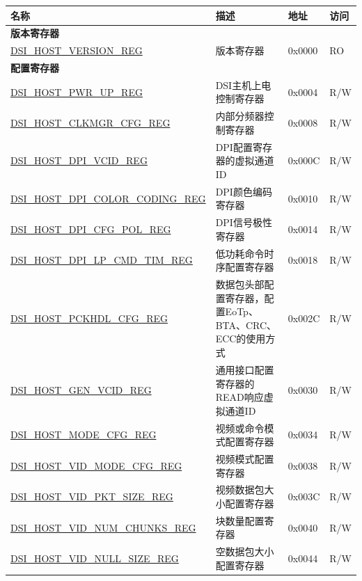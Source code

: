 \begin{longtable}{ | p{6.8cm} | p{6.5cm} | p{1.2cm} | p{1cm} | }
\hline\rowcolor{lightgray}
名称 & 描述 & 地址 & 访问 \\ \hline
\endhead
\multicolumn{4}{|l|}{\textbf{版本寄存器}} \\ \hline
\hyperref[regdesc:DSIHOSTVERSIONREG]{DSI\_HOST\_VERSION\_REG} & 版本寄存器 & 0x0000 & RO \\ \hline
\multicolumn{4}{|l|}{\textbf{配置寄存器}} \\ \hline
\hyperref[regdesc:DSIHOSTPWRUPREG]{DSI\_HOST\_PWR\_UP\_REG} & DSI主机上电控制寄存器 & 0x0004 & R/W \\ \hline
\hyperref[regdesc:DSIHOSTCLKMGRCFGREG]{DSI\_HOST\_CLKMGR\_CFG\_REG} & 内部分频器控制寄存器 & 0x0008 & R/W \\ \hline
\hyperref[regdesc:DSIHOSTDPIVCIDREG]{DSI\_HOST\_DPI\_VCID\_REG} & DPI配置寄存器的虚拟通道ID & 0x000C & R/W \\ \hline
\hyperref[regdesc:DSIHOSTDPICOLORCODINGREG]{DSI\_HOST\_DPI\_COLOR\_CODING\_REG} & DPI颜色编码寄存器 & 0x0010 & R/W \\ \hline
\hyperref[regdesc:DSIHOSTDPICFGPOLREG]{DSI\_HOST\_DPI\_CFG\_POL\_REG} & DPI信号极性寄存器 & 0x0014 & R/W \\ \hline
\hyperref[regdesc:DSIHOSTDPILPCMDTIMREG]{DSI\_HOST\_DPI\_LP\_CMD\_TIM\_REG} & 低功耗命令时序配置寄存器 & 0x0018 & R/W \\ \hline
\hyperref[regdesc:DSIHOSTPCKHDLCFGREG]{DSI\_HOST\_PCKHDL\_CFG\_REG} & 数据包头部配置寄存器，配置EoTp、BTA、CRC、ECC的使用方式 & 0x002C & R/W \\ \hline
\hyperref[regdesc:DSIHOSTGENVCIDREG]{DSI\_HOST\_GEN\_VCID\_REG} & 通用接口配置寄存器的READ响应虚拟通道ID & 0x0030 & R/W \\ \hline
\hyperref[regdesc:DSIHOSTMODECFGREG]{DSI\_HOST\_MODE\_CFG\_REG} & 视频或命令模式配置寄存器 & 0x0034 & R/W \\ \hline
\hyperref[regdesc:DSIHOSTVIDMODECFGREG]{DSI\_HOST\_VID\_MODE\_CFG\_REG} & 视频模式配置寄存器 & 0x0038 & R/W \\ \hline
\hyperref[regdesc:DSIHOSTVIDPKTSIZEREG]{DSI\_HOST\_VID\_PKT\_SIZE\_REG} & 视频数据包大小配置寄存器 & 0x003C & R/W \\ \hline
\hyperref[regdesc:DSIHOSTVIDNUMCHUNKSREG]{DSI\_HOST\_VID\_NUM\_CHUNKS\_REG} & 块数量配置寄存器 & 0x0040 & R/W \\ \hline
\hyperref[regdesc:DSIHOSTVIDNULLSIZEREG]{DSI\_HOST\_VID\_NULL\_SIZE\_REG} & 空数据包大小配置寄存器 & 0x0044 & R/W \\ \hline

\end{longtable}

